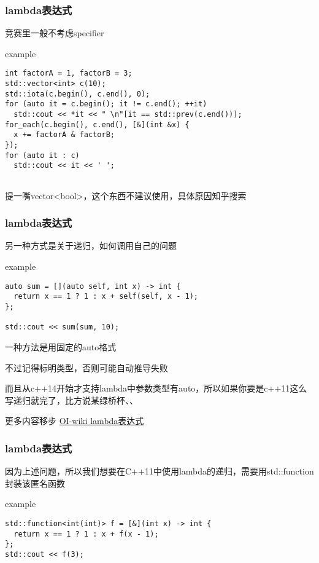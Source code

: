 \documentclass{beamer}
\begin{document}
  \begin{frame}[fragile]
    \frametitle{lambda表达式}
    竞赛里一般不考虑specifier

    \begin{block}{example}
      \begin{lstlisting}
int factorA = 1, factorB = 3;
std::vector<int> c(10);
std::iota(c.begin(), c.end(), 0);
for (auto it = c.begin(); it != c.end(); ++it)
  std::cout << *it << " \n"[it == std::prev(c.end())];
for_each(c.begin(), c.end(), [&](int &x) {
  x += factorA & factorB;
});
for (auto it : c)
  std::cout << it << ' ';
        
      \end{lstlisting}

    \end{block}

    提一嘴vector<bool>，这个东西不建议使用，具体原因知乎搜索
  \end{frame}

  \begin{frame}[fragile]
    \frametitle{lambda表达式}
    另一种方式是关于递归，如何调用自己的问题
    \begin{block}{example}
      \begin{lstlisting}
auto sum = [](auto self, int x) -> int {
  return x == 1 ? 1 : x + self(self, x - 1);
};

std::cout << sum(sum, 10);
      \end{lstlisting}

      一种方法是用固定的auto格式
      
      不过记得标明类型，否则可能自动推导失败

      而且从c++14开始才支持lambda中参数类型有auto，所以如果你要是c++11这么写递归就完了，比方说某绿桥杯、、
    \end{block}

    更多内容移步 \href{https://oi-wiki.org/lang/lambda}{OI-wiki lambda表达式}
  \end{frame}

  \begin{frame}[fragile]
    \frametitle{lambda表达式}

    因为上述问题，所以我们想要在C++11中使用lambda的递归，需要用std::function封装该匿名函数

    \begin{block}{example}
      \begin{lstlisting}
std::function<int(int)> f = [&](int x) -> int {
  return x == 1 ? 1 : x + f(x - 1);
};
std::cout << f(3);
      \end{lstlisting}      
    \end{block}
  \end{frame}
\end{document}

